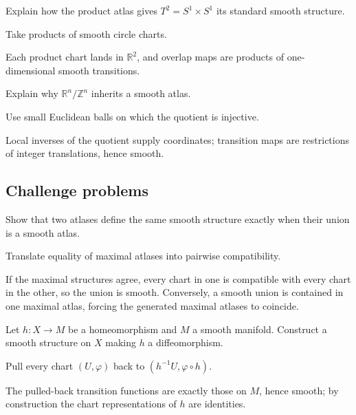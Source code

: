 \begin{exercise}\label{exr:vii02-ped-13}
Explain how the product atlas gives \(T^2=S^1\times S^1\) its standard smooth structure.
\end{exercise}
\begin{hint}
Take products of smooth circle charts.
\end{hint}
\begin{solution}
Each product chart lands in \(\mathbb R^2\), and overlap maps are products of one-dimensional smooth transitions.
\end{solution}

\begin{exercise}\label{exr:vii02-ped-14}
Explain why \(\mathbb R^n/\mathbb Z^n\) inherits a smooth atlas.
\end{exercise}
\begin{hint}
Use small Euclidean balls on which the quotient is injective.
\end{hint}
\begin{solution}
Local inverses of the quotient supply coordinates; transition maps are restrictions of integer translations, hence smooth.
\end{solution}

\subsection*{Challenge problems}

\begin{exercise}\label{exr:vii02-ped-15}
Show that two atlases define the same smooth structure exactly when their union is a smooth atlas.
\end{exercise}
\begin{hint}
Translate equality of maximal atlases into pairwise compatibility.
\end{hint}
\begin{solution}
If the maximal structures agree, every chart in one is compatible with every chart in the other, so the union is smooth.  Conversely, a smooth union is contained in one maximal atlas, forcing the generated maximal atlases to coincide.
\end{solution}

\begin{exercise}\label{exr:vii02-ped-16}
Let \(h:X\to M\) be a homeomorphism and \(M\) a smooth manifold.  Construct a smooth structure on \(X\) making \(h\) a diffeomorphism.
\end{exercise}
\begin{hint}
Pull every chart \((U,\varphi)\) back to \((h^{-1}U,\varphi\circ h)\).
\end{hint}
\begin{solution}
The pulled-back transition functions are exactly those on \(M\), hence smooth; by construction the chart representations of \(h\) are identities.
\end{solution}

